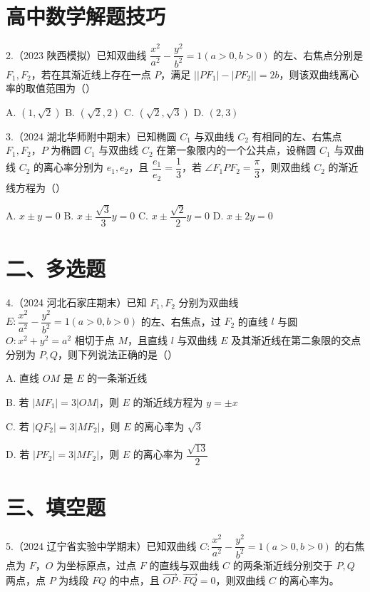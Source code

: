 \documentclass[UTF8,a4paper,11pt]{ctexart}
\begin{document}
\section*{高中数学解题技巧}

2.（2023 陕西模拟）已知双曲线 $\dfrac{x^2}{a^2}-\dfrac{y^2}{b^2}=1(a>0,b>0)$ 的左、右焦点分别是 $F_1,F_2$，若在其渐近线上存在一点 $P$，满足 $\bigl||PF_1|-|PF_2|\bigr|=2b$，则该双曲线离心率的取值范围为\hfill（\quad）

A. $(1,\sqrt{2})$ \qquad B. $(\sqrt{2},2)$ \qquad C. $(\sqrt{2},\sqrt{3})$ \qquad D. $(2,3)$

3.（2024 湖北华师附中期末）已知椭圆 $C_1$ 与双曲线 $C_2$ 有相同的左、右焦点 $F_1,F_2$，$P$ 为椭圆 $C_1$ 与双曲线 $C_2$ 在第一象限内的一个公共点，设椭圆 $C_1$ 与双曲线 $C_2$ 的离心率分别为 $e_1,e_2$，且 $\dfrac{e_1}{e_2}=\dfrac{1}{3}$，若 $\angle F_1PF_2=\dfrac{\pi}{3}$，则双曲线 $C_2$ 的渐近线方程为\hfill（\quad）

A. $x\pm y=0$ \qquad B. $x\pm \dfrac{\sqrt{3}}{3}y=0$ \qquad C. $x\pm \dfrac{\sqrt{2}}{2}y=0$ \qquad D. $x\pm 2y=0$

\section*{二、多选题}

4.（2024 河北石家庄期末）已知 $F_1,F_2$ 分别为双曲线 $E:\dfrac{x^2}{a^2}-\dfrac{y^2}{b^2}=1(a>0,b>0)$ 的左、右焦点，过 $F_2$ 的直线 $l$ 与圆 $O:x^2+y^2=a^2$ 相切于点 $M$，且直线 $l$ 与双曲线 $E$ 及其渐近线在第二象限的交点分别为 $P,Q$，则下列说法正确的是\hfill（\quad）

A. 直线 $OM$ 是 $E$ 的一条渐近线

B. 若 $|MF_1|=3|OM|$，则 $E$ 的渐近线方程为 $y=\pm x$

C. 若 $|QF_2|=3|MF_2|$，则 $E$ 的离心率为 $\sqrt{3}$

D. 若 $|PF_2|=3|MF_2|$，则 $E$ 的离心率为 $\dfrac{\sqrt{13}}{2}$

\section*{三、填空题}

5.（2024 辽宁省实验中学期末）已知双曲线 $C:\dfrac{x^2}{a^2}-\dfrac{y^2}{b^2}=1(a>0,b>0)$ 的右焦点为 $F$，$O$ 为坐标原点，过点 $F$ 的直线与双曲线 $C$ 的两条渐近线分别交于 $P,Q$ 两点，点 $P$ 为线段 $FQ$ 的中点，且 $\overrightarrow{OP}\cdot\overrightarrow{FQ}=0$，则双曲线 $C$ 的离心率为\underline{\qquad\qquad}。
\end{document}
